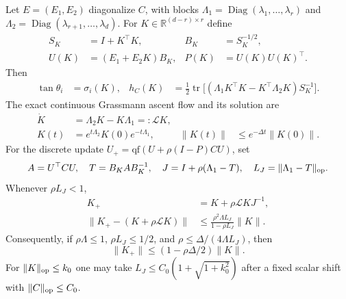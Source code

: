 \begin{proposition}
\label{prop:graph-flow}
Let $E=(E_1,E_2)$ diagonalize $C$, with blocks
$\Lambda_1=\operatorname{Diag}(\lambda_1,\ldots,\lambda_r)$ and
$\Lambda_2=\operatorname{Diag}(\lambda_{r+1},\ldots,\lambda_d)$.
For $K\in\mathbb R^{(d-r)\times r}$ define
\begin{align}
 S_K&=I+K^\top K,&B_K&=S_K^{-1/2},\\
 U(K)&=(E_1+E_2K)B_K,&P(K)&=U(K)U(K)^\top.
\end{align}
Then
\begin{align}
 \tan\theta_i&=\sigma_i(K),&
 h_C(K)&=\tfrac12\operatorname{tr}
  \big[(\Lambda_1K^\top K-K^\top\Lambda_2K)S_K^{-1}\big].\label{eq:graph-excess}
\end{align}
The exact continuous Grassmann ascent flow and its solution are
\begin{align}
 \dot K&=\Lambda_2K-K\Lambda_1=:\mathcal L K,\\
 K(t)&=e^{t\Lambda_2}K(0)e^{-t\Lambda_1},&
 \|K(t)\|&\le e^{-\Delta t}\|K(0)\|.\label{eq:exact-graph-flow}
\end{align}
For the discrete update
$U_+=\mathrm{qf}(U+\rho(I-P)CU)$, set
\begin{equation}
 A=U^\top CU,\quad T=B_KAB_K^{-1},\quad
 J=I+\rho(\Lambda_1-T),\quad L_J=\|\Lambda_1-T\|_{\rm op}.
\end{equation}
Whenever $\rho L_J<1$,
\begin{align}
 K_+&=K+\rho\mathcal LK J^{-1},\label{eq:exact-graph-qr}\\
 \|K_+-(K+\rho\mathcal LK)\|
 &\le\frac{\rho^2\Lambda L_J}{1-\rho L_J}\|K\|.
\end{align}
Consequently, if $\rho\Lambda\le1$, $\rho L_J\le1/2$,
and $\rho\le\Delta/(4\Lambda L_J)$, then
\begin{equation}
 \|K_+\|\le(1-\rho\Delta/2)\|K\|.\label{eq:qr-chart-contraction}
\end{equation}
For $\|K\|_{\rm op}\le k_0$ one may take
$L_J\le C_0(1+\sqrt{1+k_0^2})$ after a fixed scalar shift with
$\|C\|_{\rm op}\le C_0$.
\end{proposition}
